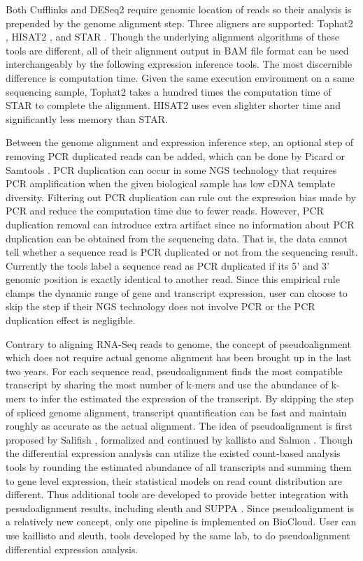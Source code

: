 Both Cufflinks and DESeq2 require genomic location of reads so their analysis
is prepended by the genome alignment step. Three aligners are supported:
Tophat2 \cite{kim2013:tophat2}, HISAT2 \cite{kim2015:hisat}, and STAR
\cite{dobin2013:star}. Though the underlying alignment algorithms of these
tools are different, all of their alignment output in BAM file format can be
used interchangeably by the following expression inference tools. The most
discernible difference is computation time. Given the same execution
environment on a same sequencing sample, Tophat2 takes a hundred times the
computation time of STAR to complete the alignment. HISAT2 uses even slighter
shorter time and significantly less memory than STAR.

Between the genome alignment and expression inference step, an optional step of
removing PCR duplicated reads can be added, which can be done by Picard
\cite{:picard} or Samtools \cite{li2009:sequence}. PCR duplication can occur in
some NGS technology that requires PCR amplification when the given biological
sample has low cDNA template diversity. Filtering out PCR duplication can rule
out the expression bias made by PCR and reduce the computation time due to
fewer reads. However, PCR duplication removal can introduce extra artifact
since no information about PCR duplication can be obtained from the sequencing
data.  That is, the data cannot tell whether a sequence read is PCR duplicated
or not from the sequencing result. Currently the tools label a sequence read as
PCR duplicated if its 5' and 3' genomic position is exactly identical to
another read. Since this empirical rule clamps the dynamic range of gene and
transcript expression, user can choose to skip the step if their NGS technology
does not involve PCR or the PCR duplication effect is negligible.

Contrary to aligning RNA-Seq reads to genome, the concept of pseudoalignment
which does not require actual genome alignment has been brought up in the last
two years. For each sequence read, pseudoalignment finds the most compatible
transcript by sharing the most number of k-mers and use the abundance of k-mers
to infer the estimated the expression of the transcript. By skipping the step
of spliced genome alignment, transcript quantification can be fast and maintain
roughly as accurate as the actual alignment. The idea of pseudoalignment is
first proposed by Salifish \cite{patro2014:sailfish}, formalized and continued
by kallisto \cite{bray2016:nearoptimal} and Salmon \cite{patro2015:accurate}.
Though the differential expression analysis can utilize the existed count-based
analysis tools by rounding the estimated abundance of all transcripts and
summing them to gene level expression, their statistical models on read count
distribution are different. Thus additional tools are developed to provide
better integration with pesudoalignment results, including sleuth
\cite{pimentel2016:differential} and SUPPA \cite{alamancos2015:leveraging}.
Since pseudoalignment is a relatively new concept, only one pipeline is
implemented on BioCloud. User can use kaillisto and sleuth, tools developed by
the same lab, to do pseudoalignment differential expression analysis.

